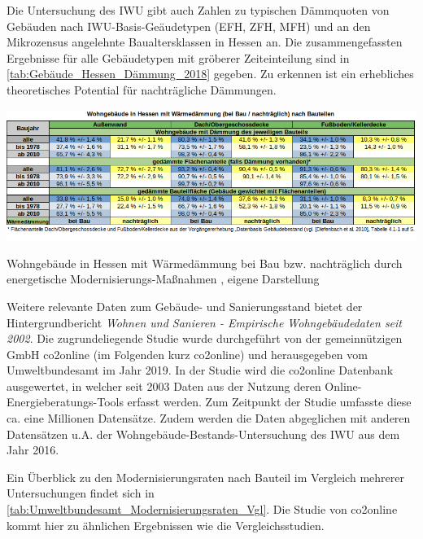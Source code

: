 				Die Untersuchung des IWU gibt auch Zahlen zu typischen Dämmquoten von Gebäuden nach IWU-Basis-Geäudetypen (EFH, ZFH, MFH) und an den Mikrozensus angelehnte Baualtersklassen in Hessen an. Die zusammengefassten Ergebnisse für alle Gebäudetypen mit gröberer Zeiteinteilung sind in \autoref{tab:Gebäude_Hessen_Dämmung_2018} gegeben. Zu erkennen ist ein erhebliches theoretisches Potential für nachträgliche Dämmungen.

				\begin{table}[H]
					\includegraphics[width=\linewidth]{Medien/tables/IWU_2018_Anteil_Wohngebäude_Hessen_Wärmedämmung_Außen_Dach_Boden.png}
					\caption{Wohngebäude in Hessen mit Wärmedämmung bei Bau bzw. nachträglich durch energetische Modernisierungs-Maßnahmen \cite[S.~108]{IWU_2018_Wohngebäudebestand_2016}, eigene Darstellung}
					\label{tab:Gebäude_Hessen_Dämmung_2018}
				\end{table}

				Weitere relevante Daten zum Gebäude- und Sanierungsstand bietet der Hintergrundbericht \textit{Wohnen und Sanieren - Empirische Wohngebäudedaten seit 2002}. Die zugrundeliegende Studie wurde durchgeführt von der gemeinnützigen GmbH co2online (im Folgenden kurz co2online) und herausgegeben vom Umweltbundesamt im Jahr 2019. In der Studie wird die co2online Datenbank ausgewertet, in welcher seit 2003 Daten aus der Nutzung deren Online-Energieberatungs-Tools erfasst werden. Zum Zeitpunkt der Studie umfasste diese ca. eine Millionen Datensätze. Zudem werden die Daten abgeglichen mit anderen Datensätzen u.A. der Wohngebäude-Bestands-Untersuchung des IWU aus dem Jahr 2016. \cite{Umweltbundesamt_Wohnen_und_Sanieren_2019} 
				
				Ein Überblick zu den Modernisierungsraten nach Bauteil im Vergleich mehrerer Untersuchungen findet sich in \autoref{tab:Umweltbundesamt_Modernisierungsraten_Vgl}. Die Studie von co2online kommt hier zu ähnlichen Ergebnissen wie die Vergleichsstudien. 
				
